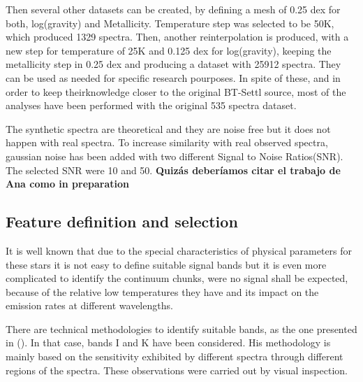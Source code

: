{
Then several other datasets can be created, by defining a mesh of 0.25 dex for 
both, log(gravity) and Metallicity. Temperature step was selected to be 50K, 
which produced 1329 spectra.
Then, another reinterpolation is produced, with a new 
step for temperature of 25K and 0.125 dex for log(gravity), 
keeping the metallicity step in 0.25 dex and producing 
a dataset with 25912 spectra. They can be used as needed for specific 
research pourposes. In spite of these, and in order to keep theirknowledge 
closer to the original BT-Settl source, most of the analyses have been 
performed with the original 535 spectra dataset.
}

{ The synthetic spectra are theoretical and they are noise free but it
  does not happen with real spectra.  To increase similarity with real
  observed spectra, gaussian noise has been added with two different
  Signal to Noise Ratios(SNR). The selected SNR were 10 and 50. {\bf
    Quizás deberíamos citar el trabajo de Ana como in preparation} }

\subsection{Feature definition and selection}
\label{subsec:FD}
{
It is well known that due to the special characteristics of 
physical parameters for these stars it is not easy to define 
suitable signal bands but it is even more complicated to identify 
the continuum chunks, were no signal shall be expected, because of the 
relative low temperatures they have and its impact on the emission 
rates at different wavelengths.
}

{
There are technical methodologies to identify suitable bands, as the one 
presented in (\cite{2013A&A...549A.129C}). %
In that case, bands I and K have been considered. His methodology is
mainly based on the sensitivity exhibited by different spectra through
different regions of the spectra. These observations were carried out by 
visual inspection.
}

